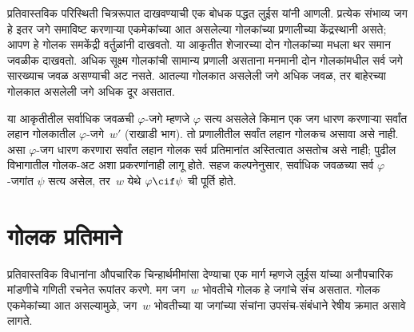 प्रतिवास्तविक परिस्थिती चित्ररूपात
दाखवण्याची एक बोधक पद्धत लुईस
यांनी आणली. प्रत्येक संभाव्य जग
हे इतर जगे समाविष्ट करणाऱ्या
एकमेकांच्या आत असलेल्या गोलकांच्या
प्रणालीच्या केंद्रस्थानी असते;
आपण हे गोलक समकेंद्री
वर्तुळांनी दाखवतो. या आकृतीत शेजारच्या दोन गोलकांच्या मधला थर
समान जवळीक दाखवतो. अधिक सूक्ष्म गोलकांची सामान्य
प्रणाली असताना मनमानी दोन गोलकांमधील सर्व जगे
सारख्याच जवळ असण्याची अट नसते.
आतल्या गोलकात असलेली जगे
अधिक जवळ, तर बाहेरच्या
गोलकात असलेली जगे अधिक
दूर असतात.
\begin{center}
\end{center}
या आकृतीतील सर्वाधिक जवळची $\varphi$-जगे म्हणजे
$\varphi$ सत्य असलेले किमान एक जग धारण करणाऱ्या
सर्वांत लहान गोलकातील $\varphi$-जगे~$w'$ (राखाडी भाग).
तो प्रणालीतील सर्वांत लहान गोलकच असावा असे नाही.
असा $\varphi$-जग धारण करणारा सर्वांत लहान गोलक
सर्व प्रतिमानांत अस्तित्वात असतोच असे नाही;
पुढील विभागातील गोलक-अट अशा प्रकरणांनाही लागू होते.
सहज कल्पनेनुसार,
सर्वाधिक जवळच्या सर्व
$\varphi$-जगांत $\psi$ सत्य
असेल, तर~$w$ येथे
$\varphi \cif \psi$ ची
पूर्ति होते.













\section{गोलक प्रतिमाने}\label{con:min:sph:sec}

प्रतिवास्तविक विधानांना औपचारिक
चिन्हार्थमीमांसा देण्याचा एक मार्ग
म्हणजे लुईस यांच्या अनौपचारिक
मांडणीचे गणिती रचनेत रूपांतर करणे.
मग जग~$w$ भोवतीचे गोलक
हे जगांचे संच असतात.
गोलक एकमेकांच्या आत
असल्यामुळे, जग~$w$ भोवतीच्या
या जगांच्या संचांना उपसंच-संबंधाने
रेषीय क्रमात असावे लागते.

